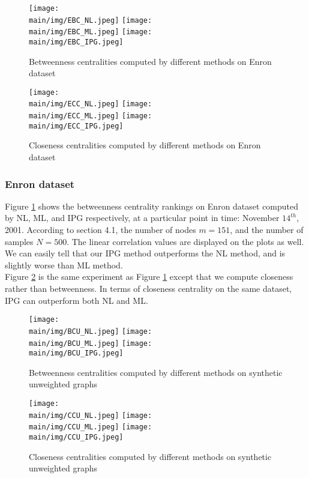 \documentclass[\main/thesis.tex]{subfiles}
\begin{document}
\begin{figure}
\texttt{[image: \\main/img/EBC\_NL.jpeg]}
\texttt{[image: \\main/img/EBC\_ML.jpeg]}
\centering
\texttt{[image: \\main/img/EBC\_IPG.jpeg]}

\caption{Betweenness centralities computed by different methods on Enron dataset}
\label{btw_enron}
\end{figure}

\begin{figure}
\texttt{[image: \\main/img/ECC\_NL.jpeg]}
\texttt{[image: \\main/img/ECC\_ML.jpeg]}
\centering
\texttt{[image: \\main/img/ECC\_IPG.jpeg]}
\caption{Closeness centralities computed by different methods on Enron dataset}
\label{cl_enron}
\end{figure}


\subsubsection{Enron dataset}
Figure \ref{btw_enron} shows the betweenness centrality rankings on Enron dataset computed by NL, ML, and IPG respectively, at a particular point in time: November $14^{th}$, 2001. According to section 4.1, the number of nodes $m = 151$, and the number of samples $N = 500$. The linear correlation values are displayed on the plots as well. We can easily tell that our IPG method outperforms the NL method, and is slightly worse than ML method.\\
Figure \ref{cl_enron} is the same experiment as Figure \ref{btw_enron} except that we compute closeness rather than betweenness. In terms of closeness centrality on the same dataset, IPG can outperform both NL and ML.



\begin{figure}
\texttt{[image: \\main/img/BCU\_NL.jpeg]}
\texttt{[image: \\main/img/BCU\_ML.jpeg]}
\centering
\texttt{[image: \\main/img/BCU\_IPG.jpeg]}
\caption{Betweenness centralities computed by different methods on synthetic unweighted graphs}
\label{btw_unweighted}
\end{figure}

\begin{figure}
\texttt{[image: \\main/img/CCU\_NL.jpeg]}
\texttt{[image: \\main/img/CCU\_ML.jpeg]}
\centering
\texttt{[image: \\main/img/CCU\_IPG.jpeg]}
\caption{Closeness centralities computed by different methods on synthetic unweighted graphs}
\label{cl_unweighted}
\end{figure}
\end{document}
